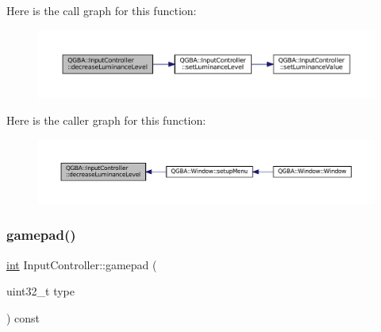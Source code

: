 Here is the call graph for this function\+:
\nopagebreak
\begin{figure}[H]
\begin{center}
\leavevmode
\includegraphics[width=350pt]{class_q_g_b_a_1_1_input_controller_a774ccf527bcb6167c25259b8ace0483f_cgraph}
\end{center}
\end{figure}
Here is the caller graph for this function\+:
\nopagebreak
\begin{figure}[H]
\begin{center}
\leavevmode
\includegraphics[width=350pt]{class_q_g_b_a_1_1_input_controller_a774ccf527bcb6167c25259b8ace0483f_icgraph}
\end{center}
\end{figure}
\mbox{\label{class_q_g_b_a_1_1_input_controller_a94c559c9cd8c9af39a4382079f0e8b95}} 
\subsubsection{\texorpdfstring{gamepad()}{gamepad()}}
{\footnotesize\ttfamily \mbox{\hyperlink{ioapi_8h_a787fa3cf048117ba7123753c1e74fcd6}{int}} Input\+Controller\+::gamepad (\begin{DoxyParamCaption}\item[{uint32\+\_\+t}]{type }\end{DoxyParamCaption}) const}

\mbox{\label{class_q_g_b_a_1_1_input_controller_af61ebb5bca73dca53b40eadf12947ade}} 
